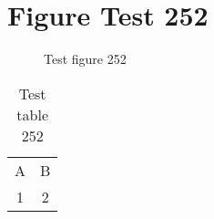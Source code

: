 \documentclass{article}
\begin{document}
\section{Figure Test 252}
\begin{figure}[h]
\caption{Test figure 252}
\end{figure}
\begin{table}[h]
\caption{Test table 252}
\begin{tabular}{cc}
A & B \\
1 & 2
\end{tabular}
\end{table}
\end{document}
